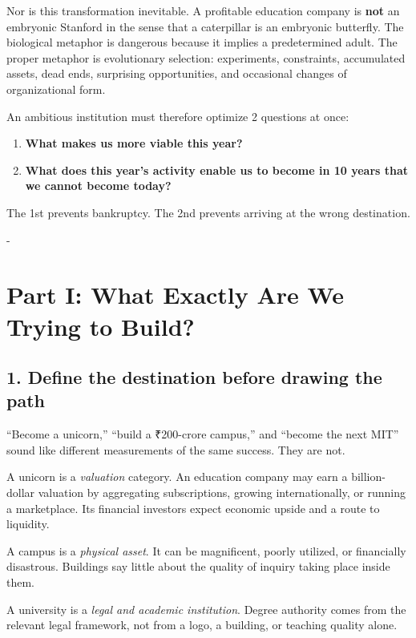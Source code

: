 Nor is this transformation inevitable. A profitable education company is \textbf{not} an embryonic Stanford in the sense that a caterpillar is an embryonic butterfly. The biological metaphor is dangerous because it implies a predetermined adult. The proper metaphor is evolutionary selection: experiments, constraints, accumulated assets, dead ends, surprising opportunities, and occasional changes of organizational form.

An ambitious institution must therefore optimize 2 questions at once:

\begin{enumerate}[leftmargin=*,itemsep=1.5pt]
  \item \textbf{What makes us more viable this year?}
  \item \textbf{What does this year's activity enable us to become in 10 years that we cannot become today?}
\end{enumerate}

The 1st prevents bankruptcy. The 2nd prevents arriving at the wrong destination.

-

\section*{Part I: What Exactly Are We Trying to Build?}

\subsection{1. Define the destination before drawing the path}

``Become a unicorn,'' ``build a \textnormal{₹}200-crore campus,'' and ``become the next MIT'' sound like different measurements of the same success. They are not.

A unicorn is a \textit{valuation} category. An education company may earn a billion-dollar valuation by aggregating subscriptions, growing internationally, or running a marketplace. Its financial investors expect economic upside and a route to liquidity.

A campus is a \textit{physical asset}. It can be magnificent, poorly utilized, or financially disastrous. Buildings say little about the quality of inquiry taking place inside them.

A university is a \textit{legal and academic institution}. Degree authority comes from the relevant legal framework, not from a logo, a building, or teaching quality alone.

